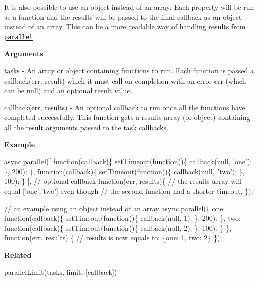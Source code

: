 It is also possible to use an object instead of an array. Each property will be run as a function and the results will be passed to the final {\ttfamily callback} as an object instead of an array. This can be a more readable way of handling results from \href{#parallel}{\tt {\ttfamily parallel}}.

{\bfseries Arguments}


\begin{DoxyItemize}
\item {\ttfamily tasks} -\/ An array or object containing functions to run. Each function is passed a {\ttfamily callback(err, result)} which it must call on completion with an error {\ttfamily err} (which can be {\ttfamily null}) and an optional {\ttfamily result} value.
\item {\ttfamily callback(err, results)} -\/ An optional callback to run once all the functions have completed successfully. This function gets a results array (or object) containing all the result arguments passed to the task callbacks.
\end{DoxyItemize}

{\bfseries Example}


\begin{DoxyCode}
async.parallel([
    function(callback)\{
        setTimeout(function()\{
            callback(null, 'one');
        \}, 200);
    \},
    function(callback)\{
        setTimeout(function()\{
            callback(null, 'two');
        \}, 100);
    \}
],
// optional callback
function(err, results)\{
    // the results array will equal ['one','two'] even though
    // the second function had a shorter timeout.
\});


// an example using an object instead of an array
async.parallel(\{
    one: function(callback)\{
        setTimeout(function()\{
            callback(null, 1);
        \}, 200);
    \},
    two: function(callback)\{
        setTimeout(function()\{
            callback(null, 2);
        \}, 100);
    \}
\},
function(err, results) \{
    // results is now equals to: \{one: 1, two: 2\}
\});
\end{DoxyCode}


{\bfseries Related}


\begin{DoxyItemize}
\item parallel\+Limit(tasks, limit, \mbox{[}callback\mbox{]}) 


\end{DoxyItemize}

\label{_whilst}%
